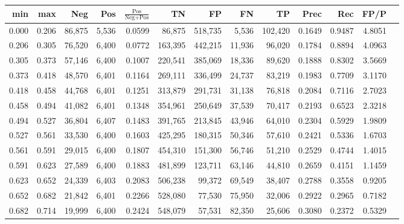 \begin{tabular}{rrrrrrrrrrrrr}
\toprule
  min &   max &    Neg &   Pos & $\frac{\text{Pos}}{\text{Neg}+\text{Pos}}$ &      TN &      FP &      FN &      TP &   Prec &    Rec &   FP/P \\
\midrule
0.000 & 0.206 & 86,875 & 5,536 &                                     0.0599 &  86,875 & 518,735 &   5,536 & 102,420 & 0.1649 & 0.9487 & 4.8051 \\
0.206 & 0.305 & 76,520 & 6,400 &                                     0.0772 & 163,395 & 442,215 &  11,936 &  96,020 & 0.1784 & 0.8894 & 4.0963 \\
0.305 & 0.373 & 57,146 & 6,400 &                                     0.1007 & 220,541 & 385,069 &  18,336 &  89,620 & 0.1888 & 0.8302 & 3.5669 \\
0.373 & 0.418 & 48,570 & 6,401 &                                     0.1164 & 269,111 & 336,499 &  24,737 &  83,219 & 0.1983 & 0.7709 & 3.1170 \\
0.418 & 0.458 & 44,768 & 6,401 &                                     0.1251 & 313,879 & 291,731 &  31,138 &  76,818 & 0.2084 & 0.7116 & 2.7023 \\
0.458 & 0.494 & 41,082 & 6,401 &                                     0.1348 & 354,961 & 250,649 &  37,539 &  70,417 & 0.2193 & 0.6523 & 2.3218 \\
0.494 & 0.527 & 36,804 & 6,407 &                                     0.1483 & 391,765 & 213,845 &  43,946 &  64,010 & 0.2304 & 0.5929 & 1.9809 \\
0.527 & 0.561 & 33,530 & 6,400 &                                     0.1603 & 425,295 & 180,315 &  50,346 &  57,610 & 0.2421 & 0.5336 & 1.6703 \\
0.561 & 0.591 & 29,015 & 6,400 &                                     0.1807 & 454,310 & 151,300 &  56,746 &  51,210 & 0.2529 & 0.4744 & 1.4015 \\
0.591 & 0.623 & 27,589 & 6,400 &                                     0.1883 & 481,899 & 123,711 &  63,146 &  44,810 & 0.2659 & 0.4151 & 1.1459 \\
0.623 & 0.652 & 24,339 & 6,403 &                                     0.2083 & 506,238 &  99,372 &  69,549 &  38,407 & 0.2788 & 0.3558 & 0.9205 \\
0.652 & 0.682 & 21,842 & 6,401 &                                     0.2266 & 528,080 &  77,530 &  75,950 &  32,006 & 0.2922 & 0.2965 & 0.7182 \\
0.682 & 0.714 & 19,999 & 6,400 &                                     0.2424 & 548,079 &  57,531 &  82,350 &  25,606 & 0.3080 & 0.2372 & 0.5329 \\

\end{tabular}
